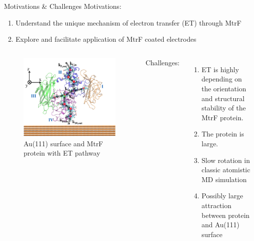 \documentclass{beamer}
\begin{document}
\begin{frame}{Motivations \& Challenges}
	Motivations: 
	\begin{enumerate}
		\item Understand the unique mechanism of electron transfer (ET) through MtrF
		\item Explore and facilitate application of MtrF coated electrodes
	\end{enumerate}
	\begin{columns}
		\begin{figure}
			\includegraphics[width=\columnwidth]{Pics/MtrF_path.png}
			\caption{Au(111) surface and MtrF protein with ET pathway}
		\end{figure}
		Challenges:
		\begin{enumerate}
			\item ET is highly depending on the orientation and structural stability of the MtrF protein. 
			\item The protein is large. 
			\item Slow rotation in classic atomistic MD simulation
			\item Possibly large attraction between protein and Au(111) surface 
		\end{enumerate} 
	\end{columns}
\end{frame}
\end{document}

